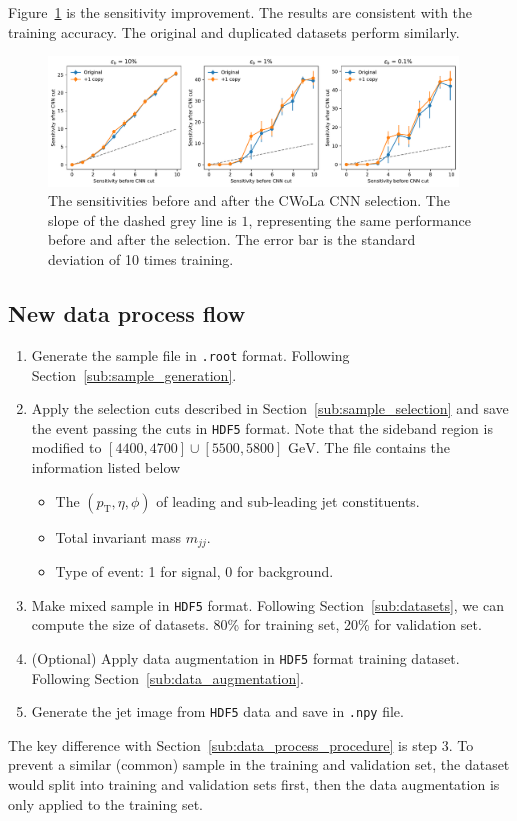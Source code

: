 \documentclass[12pt]{article}
\begin{document}
		Figure~\ref{fig:sensitivity_improvement_split_validation_first} is the sensitivity improvement. The results are consistent with the training accuracy. The original and duplicated datasets perform similarly.
		\begin{figure}[htpb]
			\centering
			\includegraphics[width=0.97\textwidth]{HVmodel_sensitivity_improvement_origin_copy_1_split_val.pdf}
			\caption{The sensitivities before and after the CWoLa CNN selection. The slope of the dashed grey line is $1$, representing the same performance before and after the selection. The error bar is the standard deviation of 10 times training.}
			\label{fig:sensitivity_improvement_split_validation_first}
		\end{figure}
	\subsection{New data process flow}%
	\label{sub:new_data_process_flow}
		\begin{enumerate}
			\item Generate the sample file in \verb|.root| format. Following Section~\ref{sub:sample_generation}.
			\item Apply the selection cuts described in Section~\ref{sub:sample_selection} and save the event passing the cuts in \verb|HDF5| format. Note that the sideband region is modified to $[4400,4700] \cup [5500,5800] \text{ GeV}$. The file contains the information listed below 
				\begin{itemize}
					\item The $\left( p_{\text{T}}, \eta, \phi \right) $ of leading and sub-leading jet constituents.
					\item Total invariant mass $m_{jj}$.
					\item Type of event: 1 for signal, 0 for background.	
				\end{itemize}
			\item Make mixed sample in \verb|HDF5| format. Following Section~\ref{sub:datasets}, we can compute the size of datasets. 80\% for training set, 20\% for validation set.
			\item (Optional) Apply data augmentation in \verb|HDF5| format training dataset. Following Section~\ref{sub:data_augmentation}.
			\item Generate the jet image from \verb|HDF5| data and save in \verb|.npy| file.
		\end{enumerate}
		The key difference with Section~\ref{sub:data_process_procedure} is step 3. To prevent a similar (common) sample in the training and validation set, the dataset would split into training and validation sets first, then the data augmentation is only applied to the training set.
\end{document}
